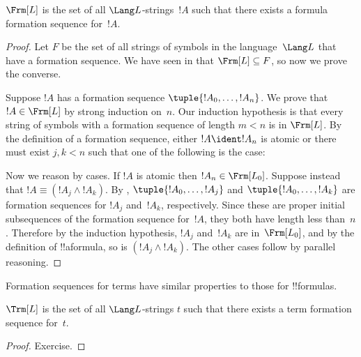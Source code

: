 \documentclass[../../../include/open-logic-section]{subfiles}
\begin{document}
\begin{thm}
$\Frm[L]$ is the set of all $\Lang L$-strings~$!A$ such that
there exists a formula formation sequence for~$!A$.
\end{thm}

\begin{proof}
Let $F$ be the set of all strings of symbols in the language~$\Lang L$
that have a formation sequence. We have seen in
 that $\Frm[L] \subseteq F$, so now
we prove the converse.

Suppose $!A$ has a formation sequence $\tuple{!A_0,\dotsc,!A_n}$.
We prove that $!A \in \Frm[L]$ by strong induction on~$n$.
Our induction hypothesis is that every string of symbols with a
formation sequence of length $m < n$ is in $\Frm[L]$.
By the definition of a formation sequence, either $!A \ident !A_n$ is
atomic or there must exist $j,k < n$ such that one of the
following is the case:
\begin{enumerate}
\end{enumerate}
Now we reason by cases. If $!A$ is atomic then
$!A_n \in \Frm[L_0]$. Suppose instead that
$!A \equiv (!A_j \land !A_k)$. By 
,
$\tuple{!A_0,\dotsc,!A_j}$ and $\tuple{!A_0,\dotsc,!A_k}$ are
formation sequences for $!A_j$ and~$!A_k$, respectively. Since
these are proper initial subsequences of the formation sequence
for~$!A$, they both have length less than~$n$. Therefore by
the induction hypothesis, $!A_j$ and~$!A_k$ are in~$\Frm[L_0]$,
and by the definition of !!a{formula}, so is
$(!A_j \land !A_k)$. The other cases follow by parallel
reasoning.
\end{proof}

Formation sequences for terms have similar properties to those
for !!{formula}s.

\begin{prop}
$\Trm[L]$ is the set of all $\Lang L$-strings $t$
such that there exists a term formation sequence for~$t$.
\end{prop}

\begin{proof}
Exercise.
\end{proof}
\end{document}
